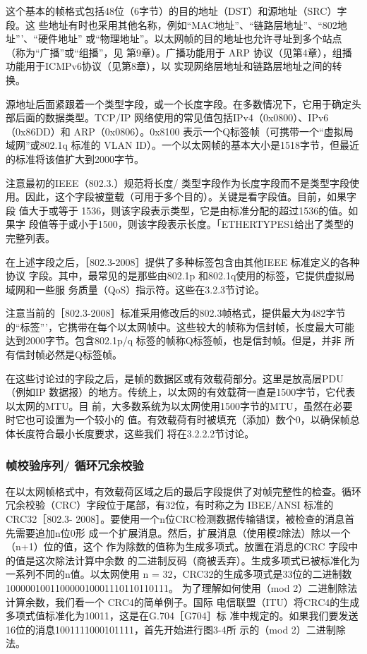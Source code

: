 这个基本的帧格式包括48位（6字节）的目的地址（DST）和源地址（SRC）字段。这
些地址有时也采用其他名称，例如“MAC地址”、“链路层地址”、“802地址”’、“硬件地址”
或“物理地址”。以太网帧的目的地址也允许寻址到多个站点（称为“广播”或“组播”，见
第9章）。广播功能用于 ARP 协议（见第4章），组播功能用于ICMPv6协议（见第8章），以
实现网络层地址和链路层地址之间的转换。

源地址后面紧跟着一个类型字段，或一个长度字段。在多数情况下，它用于确定头
部后面的数据类型。TCP/IP 网络使用的常见值包括IPv4（0x0800）、IPv6（0x86DD）和
ARP（0x0806）。0x8100 表示一个Q标签帧（可携带一个“虚拟局域网”或802.1q 标准的
VLAN ID）。一个以太网帧的基本大小是1518字节，但最近的标准将该值扩大到2000字节。

\begin{tcolorbox}
  注意最初的IEEE（802.3.）规范将长度/ 类型字段作为长度字段而不是类型字段使
  用。因此，这个字段被童载（可用于多个目的）。关键是看字段值。目前，如果字段
  值大于或等于 1536，则该字段表示类型，它是由标准分配的超过1536的值。如果字
  段值等于或小于1500，则该字段表示长度。「ETHERTYPES1给出了类型的完整列表。
\end{tcolorbox}

在上述字段之后，［802.3-2008］提供了多种标签包含由其他IEEE 标准定义的各种协议
字段。其中，最常见的是那些由802.1p 和802.1q使用的标签，它提供虚拟局域网和一些服
务质量（QoS）指示符。这些在3.2.3节讨论。

\begin{tcolorbox}
  注意当前的［802.3-2008］标准采用修改后的802.3帧格式，提供最大为482字节
  的“标签”'，它携带在每个以太网帧中。这些较大的帧称为信封帧，长度最大可能
  达到2000字节。包含802.1p/q 标签的帧称Q标签帧，也是信封帧。但是，并非
  所有信封帧必然是Q标签帧。
\end{tcolorbox}

在这些讨论过的字段之后，是帧的数据区或有效载荷部分。这里是放高层PDU（例如IP
数据报）的地方。传统上，以太网的有效载荷一直是1500字节，它代表以太网的MTU。目
前，大多数系统为以太网使用1500字节的MTU，虽然在必要时它也可设置为一个较小的
值。有效载荷有时被填充（添加）数个0，以确保帧总体长度符合最小长度要求，这些我们
将在3.2.2.2节讨论。

\subsubsection{帧校验序列/ 循环冗余校验}

在以太网帧格式中，有效载荷区域之后的最后字段提供了对帧完整性的检查。循环
冗余校验（CRC）字段位于尾部，有32位，有时称之为 IBEE/ANSI 标准的CRC32［802.3-
2008］。要使用一个n位CRC检测数据传输错误，被检查的消息首先需要追加n位0形
成一个扩展消息。然后，扩展消息（使用模2除法）除以一个（n+1）位的值，这个
作为除数的值称为生成多项式。放置在消息的CRC 字段中的值是这次除法计算中余数
的二进制反码（商被丢弃）。生成多项式已被标准化为一系列不同的n值。以太网使用
n = 32，CRC32的生成多项式是33位的二进制数100000100110000010001110110110111。
为了理解如何使用（mod 2）二进制除法计算余数，我们看一个 CRC4的简单例子。国际
电信联盟（ITU）将CRC4的生成多项式值标准化为10011，这是在G.704［G704］标
准中规定的。如果我们要发送16位的消息1001111000101111，首先开始进行图3-4所
示的（mod 2）二进制除法。


